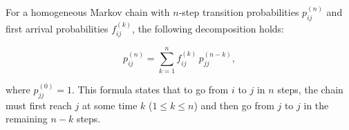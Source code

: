 For a homogeneous Markov chain with $n$-step transition probabilities $p_{ij}^{(n)}$ and first arrival probabilities $f_{ij}^{(k)}$, the following decomposition holds:

$$p_{ij}^{(n)} = \sum_{k=1}^{n} f_{ij}^{(k)} \, p_{jj}^{(n-k)},$$

where $p_{jj}^{(0)} = 1$. This formula states that to go from $i$ to $j$ in $n$ steps, the chain must first reach $j$ at some time $k$ ($1 \leq k \leq n$) and then go from $j$ to $j$ in the remaining $n-k$ steps.
